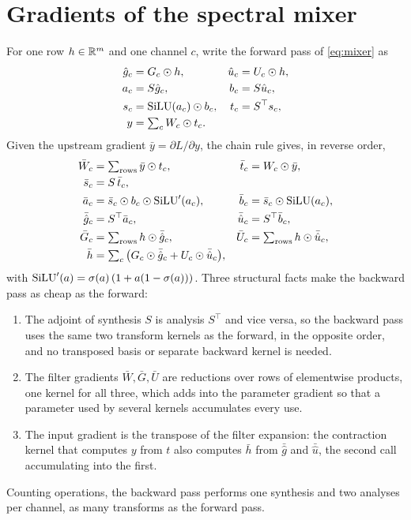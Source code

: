 
\section{Gradients of the spectral mixer}
\label{sec:gradients}

For one row $h\in\mathbb{R}^m$ and one channel $c$, write the forward pass of
\cref{eq:mixer} as
\begin{align}
\hat g_c &= G_c\odot h, & \hat u_c &= U_c\odot h, \nonumber\\
a_c &= S\hat g_c, & b_c &= S\hat u_c, \nonumber\\
s_c &= \operatorname{SiLU}(a_c)\odot b_c, & t_c &= S^\top s_c, \nonumber\\
y &= \textstyle\sum_c W_c\odot t_c. \label{eq:mixer-steps}
\end{align}
Given the upstream gradient $\bar y=\partial L/\partial y$, the chain rule
gives, in reverse order,
\begin{align}
\bar W_c &= \textstyle\sum_{\text{rows}} \bar y\odot t_c, & \bar t_c &= W_c\odot\bar y, \nonumber\\
\bar s_c &= S\,\bar t_c, \nonumber\\
\bar a_c &= \bar s_c\odot b_c\odot\operatorname{SiLU}'(a_c), & \bar b_c &= \bar s_c\odot\operatorname{SiLU}(a_c), \nonumber\\
\bar{\hat g}_c &= S^\top\bar a_c, & \bar{\hat u}_c &= S^\top\bar b_c, \nonumber\\
\bar G_c &= \textstyle\sum_{\text{rows}} h\odot\bar{\hat g}_c, & \bar U_c &= \textstyle\sum_{\text{rows}} h\odot\bar{\hat u}_c, \nonumber\\
\bar h &= \textstyle\sum_c \big(G_c\odot\bar{\hat g}_c + U_c\odot\bar{\hat u}_c\big), \label{eq:mixer-grad}
\end{align}
with $\operatorname{SiLU}'(a)=\sigma(a)\,(1+a(1-\sigma(a)))$. Three structural facts make
the backward pass as cheap as the forward:
\begin{enumerate}
\item The adjoint of synthesis $S$ is analysis $S^\top$ and vice versa, so
  the backward pass uses the same two transform kernels as the forward, in the
  opposite order, and no transposed basis or separate backward kernel is
  needed.
\item The filter gradients $\bar W,\bar G,\bar U$ are reductions over rows of
  elementwise products, one kernel for all three, which adds into the
  parameter gradient so that a parameter used by several kernels accumulates
  every use.
\item The input gradient is the transpose of the filter expansion: the
  contraction kernel that computes $y$ from $t$ also computes $\bar h$ from
  $\bar{\hat g}$ and $\bar{\hat u}$, the second call accumulating into the
  first.
\end{enumerate}
Counting operations, the backward pass performs one synthesis and two
analyses per channel, as many transforms as the forward pass.
